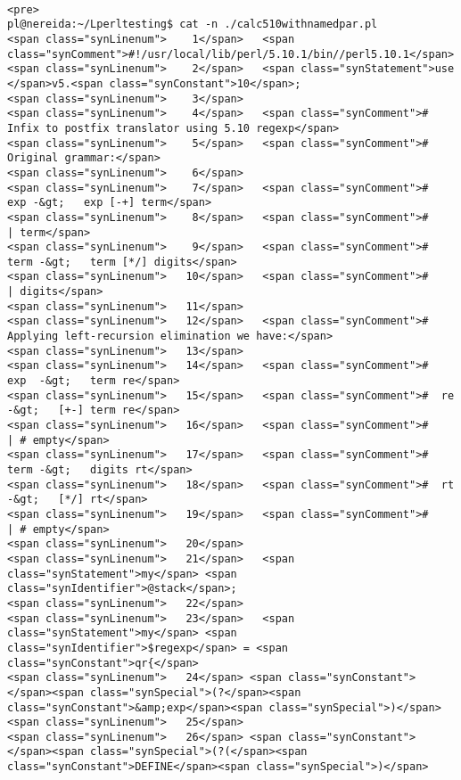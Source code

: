 \begin{verbatim}

<pre>
pl@nereida:~/Lperltesting$ cat -n ./calc510withnamedpar.pl
<span class="synLinenum">    1</span>   <span class="synComment">#!/usr/local/lib/perl/5.10.1/bin//perl5.10.1</span>
<span class="synLinenum">    2</span>   <span class="synStatement">use </span>v5.<span class="synConstant">10</span>;
<span class="synLinenum">    3</span> 
<span class="synLinenum">    4</span>   <span class="synComment"># Infix to postfix translator using 5.10 regexp</span>
<span class="synLinenum">    5</span>   <span class="synComment"># Original grammar:</span>
<span class="synLinenum">    6</span> 
<span class="synLinenum">    7</span>   <span class="synComment">#  exp -&gt;   exp [-+] term</span>
<span class="synLinenum">    8</span>   <span class="synComment">#         | term</span>
<span class="synLinenum">    9</span>   <span class="synComment">#  term -&gt;   term [*/] digits</span>
<span class="synLinenum">   10</span>   <span class="synComment">#          | digits</span>
<span class="synLinenum">   11</span> 
<span class="synLinenum">   12</span>   <span class="synComment"># Applying left-recursion elimination we have:</span>
<span class="synLinenum">   13</span> 
<span class="synLinenum">   14</span>   <span class="synComment">#  exp  -&gt;   term re</span>
<span class="synLinenum">   15</span>   <span class="synComment">#  re   -&gt;   [+-] term re</span>
<span class="synLinenum">   16</span>   <span class="synComment">#          | # empty</span>
<span class="synLinenum">   17</span>   <span class="synComment">#  term -&gt;   digits rt</span>
<span class="synLinenum">   18</span>   <span class="synComment">#  rt   -&gt;   [*/] rt</span>
<span class="synLinenum">   19</span>   <span class="synComment">#          | # empty</span>
<span class="synLinenum">   20</span> 
<span class="synLinenum">   21</span>   <span class="synStatement">my</span> <span class="synIdentifier">@stack</span>;
<span class="synLinenum">   22</span> 
<span class="synLinenum">   23</span>   <span class="synStatement">my</span> <span class="synIdentifier">$regexp</span> = <span class="synConstant">qr{</span>
<span class="synLinenum">   24</span> <span class="synConstant">      </span><span class="synSpecial">(?</span><span class="synConstant">&amp;exp</span><span class="synSpecial">)</span>
<span class="synLinenum">   25</span> 
<span class="synLinenum">   26</span> <span class="synConstant">      </span><span class="synSpecial">(?(</span><span class="synConstant">DEFINE</span><span class="synSpecial">)</span>

\end{verbatim}
